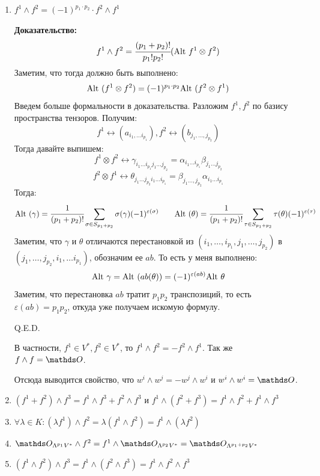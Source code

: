 \begin{enumerate}
    \item $f^1\wedge f^2 = (-1)^{p_1 \cdot p_2} \cdot  f^2 \wedge f^1$

    \textbf{Доказательство:}
    $$f^1 \wedge f^2 = \cfrac{(p_1 + p_2)!}{p_1!p_2!} (\text{Alt } f^1 \otimes f^2)$$
    Заметим, что тогда должно быть выполнено:
    $$\text{Alt } (f^1 \otimes f^2)  = (-1)^{p_1\cdot p_2} \text{Alt }(f^2\otimes f^1)$$
    Введем больше формальности в доказательства. Разложим $f^1,f^2$ по базису пространства тензоров. Получим:
    $$f^1 \leftrightarrow (a_{i_1,\ldots i_{p_1}}), f^2 \leftrightarrow (b_{j_1,\ldots, j_{p_2} }) $$
    Тогда давайте выпишем:
    $$f^1 \otimes f^2 \leftrightarrow \gamma_{i_1\ldots i_{p_1}j_1\ldots j_{p_2}} = \alpha_{i_1\ldots i_{p_1} } \beta_{j_1\ldots j_{p_2}}$$
    $$f^2\otimes f^1 \leftrightarrow \theta_{j_1\ldots j_{p_2} i_1\ldots i_{p_1}}  = \beta_{j_1\ldots, j_{p_2}}\alpha_{i_1\ldots i_{p_1}}$$
    Тогда:
    $$\text{Alt } (\gamma) = \cfrac{1}{(p_1 + p_2)!} \sum\limits_{\sigma \in S_{p_1+p_2}} \sigma(\gamma)(-1)^{\varepsilon(\sigma)} \quad\quad \text{Alt }(\theta) = \cfrac{1}{(p_1+p_2)!} \sum_{\tau \in S_{p_1+p_2}}\tau(\theta)(-1)^{\varepsilon(\tau)}$$
     Заметим, что $\gamma$ и $\theta$ отличаются перестановкой из $(i_1,\ldots,i_{p_1},j_1,\ldots, j_{p_2})$ в $(j_1,\ldots, j_{p_2},i_{1},\ldots i_{p_1})$, обозначим ее $ab$. То есть у меня выполнено:
    $$\text{Alt } \gamma = \text{Alt }(ab(\theta))=(-1)^{\varepsilon(ab)}\text{Alt } \theta$$
    Заметим, что перестановка $ab$ тратит $p_1p_2$ транспозиций, то есть $\varepsilon(ab) = p_1 p_2$, откуда уже получаем искомую формулу.

    \hfill Q.E.D.

    В частности, $f^1\in V^*,f^2\in V^*$, то $f^1 \wedge f^2 = -f^2 \wedge f^1$. Так же $f \wedge f = \zero$.

    Отсюда выводится свойство, что $w^i \wedge w^j = - w^j \wedge w^i$ и $w^i \wedge w^i = \zero$.

    \item $(f^1+f^2)\wedge f^3 = f^1\wedge f^3 + f^2 \wedge f^3$ и $f^1 \wedge (f^2 + f^3) = f^1 \wedge f^2 + f^1 \wedge f^3$
    \item $\forall \lambda \in K: (\lambda f^1)\wedge f^2 = \lambda(f^1 \wedge f^2) = f^1 \wedge (\lambda f^2)$
    \item $\zero_{\Lambda^{p_1}V^*} \wedge f^2 = f^1 \wedge \zero_{\Lambda^{p_2}V^*}=\zero_{\Lambda^{p_1+p_2}V^*}$
    \item $(f^1 \wedge f^2 ) \wedge f^3 = f^1 \wedge (f^2 \wedge f^3) = f^1 \wedge f^2 \wedge f^3$


\end{enumerate}
